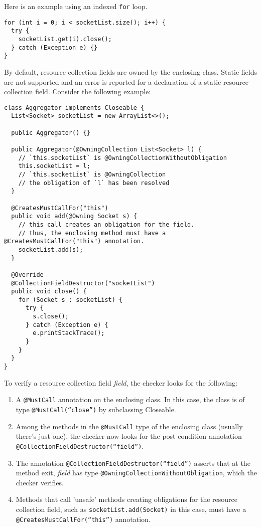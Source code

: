 Here is an example using an indexed \texttt{for} loop.

\begin{verbatim}
for (int i = 0; i < socketList.size(); i++) {
  try {
    socketList.get(i).close();
  } catch (Exception e) {}
}
\end{verbatim}

By default, resource collection fields are owned by the enclosing class. Static fields are not supported and an error is reported for a declaration of a static resource collection field.
Consider the following example:

\begin{verbatim}
class Aggregator implements Closeable {
  List<Socket> socketList = new ArrayList<>();

  public Aggregator() {}

  public Aggregator(@OwningCollection List<Socket> l) {
    // `this.socketList` is @OwningCollectionWithoutObligation
    this.socketList = l;
    // `this.socketList` is @OwningCollection
    // the obligation of `l` has been resolved
  }

  @CreatesMustCallFor("this")
  public void add(@Owning Socket s) {
    // this call creates an obligation for the field.
    // thus, the enclosing method must have a @CreatesMustCallFor("this") annotation.
    socketList.add(s);
  }

  @Override
  @CollectionFieldDestructor("socketList")
  public void close() {
    for (Socket s : socketList) {
      try {
        s.close();
      } catch (Exception e) {
        e.printStackTrace();
      }
    }
  }
}
\end{verbatim}

To verify a resource collection field \textit{field}, the checker looks for the following:
\begin{enumerate}
  \item A \texttt{@MustCall} annotation on the enclosing class. In this case, the class is of type \texttt{@MustCall(``close'')} by subclassing Closeable.
  \item Among the methods in the \texttt{@MustCall} type of the enclosing class (usually there's just one), the checker now looks for the post-condition annotation \texttt{@CollectionFieldDestructor(``field'')}.
  \item The annotation \texttt{@CollectionFieldDestructor(``field'')} asserts that at the method exit, \textit{field} has type \texttt{@OwningCollectionWithoutObligation}, which the checker verifies.
  \item Methods that call 'unsafe' methods creating obligations for the resource collection field, such as \texttt{socketList.add(Socket)} in this case, must have a \texttt{@CreatesMustCallFor(``this'')} annotation.
\end{enumerate}

